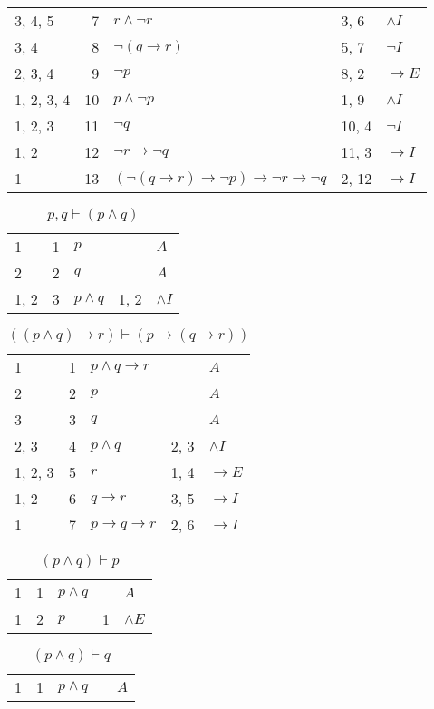 \documentclass{article}
\begin{document}
\begin{table}[htbp]
\begin{tabular}{lrlll}
{3, 4, 5} & 7 & $r∧ ¬r$ & {3, 6} & $∧I$ \\
{3, 4} & 8 & $¬ (q→r)$ & {5, 7} & $¬I$ \\
{2, 3, 4} & 9 & $¬p$ & {8, 2} & $→E$ \\
{1, 2, 3, 4} & 10 & $p∧ ¬p$ & {1, 9} & $∧I$ \\
{1, 2, 3} & 11 & $¬q$ & {10, 4} & $¬I$ \\
{1, 2} & 12 & $¬r→ ¬q$ & {11, 3} & $→I$ \\
{1} & 13 & $(¬ (q→r)→ ¬p)→ ¬r→ ¬q$ & {2, 12} & $→I$ \\
\end{tabular}
\end{table}\begin{table}[htbp]\caption*{$p,q ⊢ (p ∧ q)$}\centering\begin{tabular}{lrlll}
{1} & 1 & $p$ & {} & $A$ \\
{2} & 2 & $q$ & {} & $A$ \\
{1, 2} & 3 & $p∧q$ & {1, 2} & $∧I$ \\
\end{tabular}
\end{table}\begin{table}[htbp]\caption*{$((p ∧ q) → r) ⊢ (p → (q → r))$}\centering\begin{tabular}{lrlll}
{1} & 1 & $p∧q→r$ & {} & $A$ \\
{2} & 2 & $p$ & {} & $A$ \\
{3} & 3 & $q$ & {} & $A$ \\
{2, 3} & 4 & $p∧q$ & {2, 3} & $∧I$ \\
{1, 2, 3} & 5 & $r$ & {1, 4} & $→E$ \\
{1, 2} & 6 & $q→r$ & {3, 5} & $→I$ \\
{1} & 7 & $p→q→r$ & {2, 6} & $→I$ \\
\end{tabular}
\end{table}\begin{table}[htbp]\caption*{$(p ∧ q) ⊢ p$}\centering\begin{tabular}{lrlll}
{1} & 1 & $p∧q$ & {} & $A$ \\
{1} & 2 & $p$ & {1} & $∧E$ \\
\end{tabular}
\end{table}\begin{table}[htbp]\caption*{$(p ∧ q) ⊢ q$}\centering\begin{tabular}{lrlll}
{1} & 1 & $p∧q$ & {} & $A$ \\

\end{tabular}
\end{table}
\end{document}

